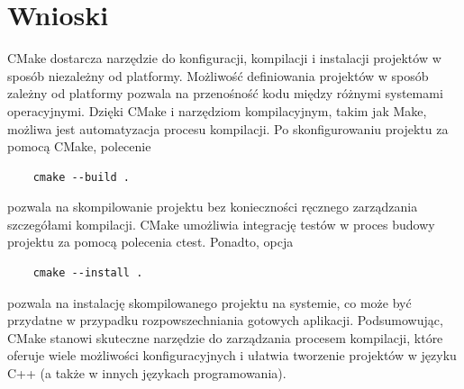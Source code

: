 \documentclass[a4paper,12pt]{article}
\begin{document}
\newpage
\clearpage

\section{Wnioski}
CMake dostarcza narzędzie do konfiguracji, kompilacji i instalacji projektów w sposób niezależny od platformy. Możliwość definiowania projektów w sposób zależny od platformy pozwala na przenośność kodu między różnymi systemami operacyjnymi. Dzięki CMake i narzędziom kompilacyjnym, takim jak Make, możliwa jest automatyzacja procesu kompilacji. Po skonfigurowaniu projektu za pomocą CMake, polecenie \begin{lstlisting}
    cmake --build .
\end{lstlisting} pozwala na skompilowanie projektu bez konieczności ręcznego zarządzania szczegółami kompilacji. CMake umożliwia integrację testów w proces budowy projektu za pomocą polecenia ctest. Ponadto, opcja \begin{lstlisting}
    cmake --install .
\end{lstlisting} pozwala na instalację skompilowanego projektu na systemie, co może być przydatne w przypadku rozpowszechniania gotowych aplikacji.
\vskip 0.5cm
Podsumowując, CMake stanowi skuteczne narzędzie do zarządzania procesem kompilacji, które oferuje wiele możliwości konfiguracyjnych i ułatwia tworzenie projektów w języku C++ (a także w innych językach programowania).
\printbibliography
\nocite{*}
\end{document}
